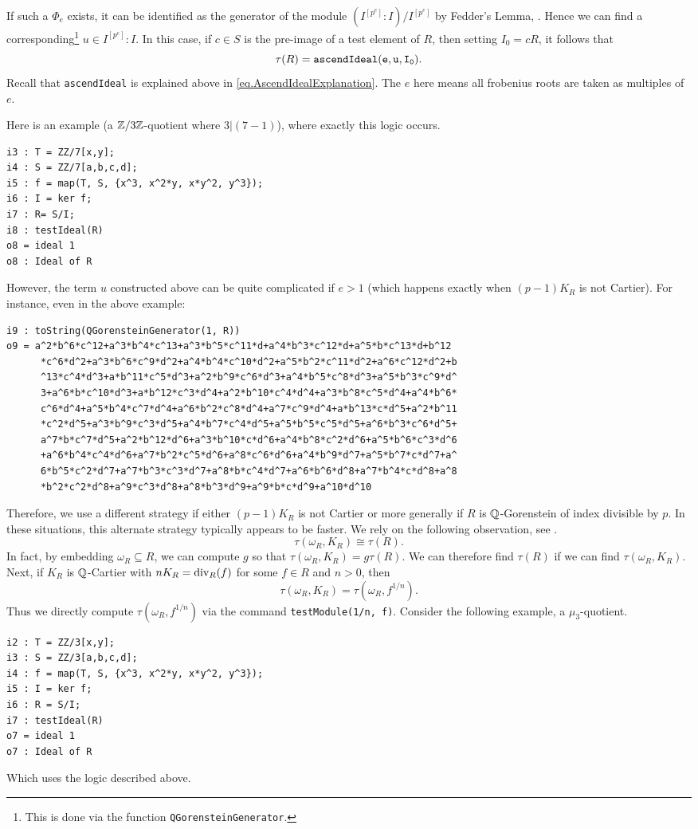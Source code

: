 \documentclass[11pt]{amsart}
\begin{document}
If such a $\Phi_e$ exists, it can be identified as the generator of the module $(I^{[p^e]} : I) / I^{[p^e]}$ by Fedder's Lemma, \cite{FedderFPureRat}.  Hence we can find a corresponding\footnote{This is done via the function \texttt{QGorensteinGenerator}. } $u \in I^{[p^e]} : I$.  In this case, if $c \in S$ is the pre-image of a test element of $R$, then setting $I_0 = cR$, it follows that
\[
\tau(R) = {\tt ascendIdeal(e, u, I_0)}.
\]
Recall that \texttt{ascendIdeal} is explained above in \autoref{eq.AscendIdealExplanation}.  The $e$ here means all frobenius roots are taken as multiples of $e$.  

Here is an example (a $\mathbb{Z}/3\mathbb{Z}$-quotient where $3 | (7-1)$), where exactly this logic occurs.
\begin{verbatim}
i3 : T = ZZ/7[x,y];
i4 : S = ZZ/7[a,b,c,d];
i5 : f = map(T, S, {x^3, x^2*y, x*y^2, y^3});
i6 : I = ker f;
i7 : R= S/I;
i8 : testIdeal(R)
o8 = ideal 1
o8 : Ideal of R
\end{verbatim}
However, the term $u$ constructed above can be quite complicated if $e > 1$ (which happens exactly when $(p -1)K_R$ is not Cartier).  For instance, even in the above example:
\begin{verbatim}
i9 : toString(QGorensteinGenerator(1, R))
o9 = a^2*b^6*c^12+a^3*b^4*c^13+a^3*b^5*c^11*d+a^4*b^3*c^12*d+a^5*b*c^13*d+b^12
      *c^6*d^2+a^3*b^6*c^9*d^2+a^4*b^4*c^10*d^2+a^5*b^2*c^11*d^2+a^6*c^12*d^2+b
      ^13*c^4*d^3+a*b^11*c^5*d^3+a^2*b^9*c^6*d^3+a^4*b^5*c^8*d^3+a^5*b^3*c^9*d^
      3+a^6*b*c^10*d^3+a*b^12*c^3*d^4+a^2*b^10*c^4*d^4+a^3*b^8*c^5*d^4+a^4*b^6*
      c^6*d^4+a^5*b^4*c^7*d^4+a^6*b^2*c^8*d^4+a^7*c^9*d^4+a*b^13*c*d^5+a^2*b^11
      *c^2*d^5+a^3*b^9*c^3*d^5+a^4*b^7*c^4*d^5+a^5*b^5*c^5*d^5+a^6*b^3*c^6*d^5+
      a^7*b*c^7*d^5+a^2*b^12*d^6+a^3*b^10*c*d^6+a^4*b^8*c^2*d^6+a^5*b^6*c^3*d^6
      +a^6*b^4*c^4*d^6+a^7*b^2*c^5*d^6+a^8*c^6*d^6+a^4*b^9*d^7+a^5*b^7*c*d^7+a^
      6*b^5*c^2*d^7+a^7*b^3*c^3*d^7+a^8*b*c^4*d^7+a^6*b^6*d^8+a^7*b^4*c*d^8+a^8
      *b^2*c^2*d^8+a^9*c^3*d^8+a^8*b^3*d^9+a^9*b*c*d^9+a^10*d^10
\end{verbatim}
Therefore, we use a different strategy if either $(p-1)K_R$ is not Cartier or more generally if $R$ is $\mathbb{Q}$-Gorenstein of index divisible by $p$.   In these situations, this alternate strategy typically appears to be faster.  We rely on the following observation, see \cite{BlickleSchwedeTuckerTestAlterations}.
\[
\tau(\omega_R, K_R) \cong \tau(R).
\]
In fact, by embedding $\omega_R \subseteq R$, we can compute $g$ so that $\tau(\omega_R, K_R) = g \tau(R)$.  We can therefore find $\tau(R)$ if we can find $\tau(\omega_R, K_R)$.
Next, if $K_R$ is $\mathbb{Q}$-Cartier with $nK_R = \operatorname{{div}}_R(f)$ for some $f \in R$ and $n > 0$, then
\[
\tau(\omega_R, K_R) =\tau(\omega_R, f^{1/n}).
\]
Thus we directly compute $\tau(\omega_R, f^{1/n})$ via the command \texttt{testModule(1/n, f)}.  Consider the following example, a $\mu_3$-quotient.
\begin{verbatim}
i2 : T = ZZ/3[x,y];
i3 : S = ZZ/3[a,b,c,d];
i4 : f = map(T, S, {x^3, x^2*y, x*y^2, y^3});
i5 : I = ker f;
i6 : R = S/I;
i7 : testIdeal(R)
o7 = ideal 1
o7 : Ideal of R
\end{verbatim}
Which uses the logic described above.
\end{document}

